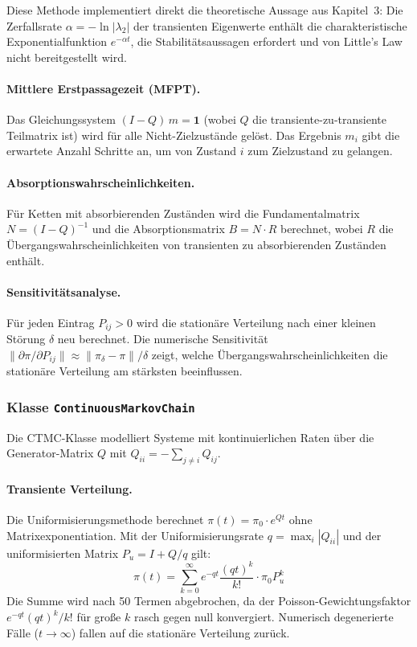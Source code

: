 ﻿\documentclass[a4paper,12pt]{scrreprt}
\theoremstyle{definition}
\begin{document}
Diese Methode implementiert direkt die theoretische Aussage aus Kapitel~3:
Die Zerfallsrate $\alpha = -\ln|\lambda_2|$ der transienten Eigenwerte
enthält die charakteristische Exponentialfunktion $e^{-\alpha t}$, die
Stabilitätsaussagen erfordert und von Little's Law nicht bereitgestellt wird.

\paragraph{Mittlere Erstpassagezeit (MFPT).}
Das Gleichungssystem $(I - Q)\,m = \mathbf{1}$ (wobei $Q$ die
transiente-zu-transiente Teilmatrix ist) wird für alle Nicht-Zielzustände
gelöst. Das Ergebnis $m_i$ gibt die erwartete Anzahl Schritte an, um von
Zustand $i$ zum Zielzustand zu gelangen.

\paragraph{Absorptionswahrscheinlichkeiten.}
Für Ketten mit absorbierenden Zuständen wird die Fundamentalmatrix
$N = (I-Q)^{-1}$ und die Absorptionsmatrix $B = N \cdot R$ berechnet,
wobei $R$ die Übergangswahrscheinlichkeiten von transienten zu
absorbierenden Zuständen enthält.

\paragraph{Sensitivitätsanalyse.}
Für jeden Eintrag $P_{ij} > 0$ wird die stationäre Verteilung nach einer
kleinen Störung $\delta$ neu berechnet. Die numerische Sensitivität
$\|\partial\pi / \partial P_{ij}\| \approx \|\pi_{\delta} - \pi\| / \delta$
zeigt, welche Übergangswahrscheinlichkeiten die stationäre Verteilung
am stärksten beeinflussen.

\subsubsection{Klasse \texttt{ContinuousMarkovChain}}

Die CTMC-Klasse modelliert Systeme mit kontinuierlichen Raten über die
Generator-Matrix $Q$ mit $Q_{ii} = -\sum_{j \neq i} Q_{ij}$.

\paragraph{Transiente Verteilung.}
Die Uniformisierungsmethode berechnet $\pi(t) = \pi_0 \cdot e^{Qt}$
ohne Matrixexponentiation. Mit der Uniformisierungsrate $q = \max_i |Q_{ii}|$
und der uniformisierten Matrix $P_u = I + Q/q$ gilt:
\begin{equation}
	\pi(t) = \sum_{k=0}^{\infty} e^{-qt} \frac{(qt)^k}{k!} \cdot \pi_0 P_u^k
\end{equation}
Die Summe wird nach 50 Termen abgebrochen, da der Poisson-Gewichtungsfaktor
$e^{-qt}(qt)^k/k!$ für große $k$ rasch gegen null konvergiert. Numerisch
degenerierte Fälle ($t \to \infty$) fallen auf die stationäre Verteilung zurück.
\end{document}
